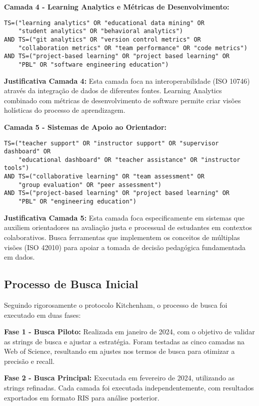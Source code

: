 \documentclass[english, spanish, brazilian]{RBIEarticle} %
\begin{document}
\textbf{Camada 4 - Learning Analytics e Métricas de Desenvolvimento:}
\begin{verbatim}
TS=("learning analytics" OR "educational data mining" OR
    "student analytics" OR "behavioral analytics")
AND TS=("git analytics" OR "version control metrics" OR
    "collaboration metrics" OR "team performance" OR "code metrics")
AND TS=("project-based learning" OR "project based learning" OR
    "PBL" OR "software engineering education")
\end{verbatim}

\textbf{Justificativa Camada 4:} Esta camada foca na interoperabilidade (ISO 10746) através da integração de dados de diferentes fontes. Learning Analytics combinado com métricas de desenvolvimento de software permite criar visões holísticas do processo de aprendizagem.

\textbf{Camada 5 - Sistemas de Apoio ao Orientador:}
\begin{verbatim}
TS=("teacher support" OR "instructor support" OR "supervisor dashboard" OR
    "educational dashboard" OR "teacher assistance" OR "instructor tools")
AND TS=("collaborative learning" OR "team assessment" OR
    "group evaluation" OR "peer assessment")
AND TS=("project-based learning" OR "project based learning" OR
    "PBL" OR "engineering education")
\end{verbatim}

\textbf{Justificativa Camada 5:} Esta camada foca especificamente em sistemas que auxiliem orientadores na avaliação justa e processual de estudantes em contextos colaborativos. Busca ferramentas que implementem os conceitos de múltiplas visões (ISO 42010) para apoiar a tomada de decisão pedagógica fundamentada em dados.

\subsection{Processo de Busca Inicial}

Seguindo rigorosamente o protocolo Kitchenham, o processo de busca foi executado em duas fases:

\textbf{Fase 1 - Busca Piloto:} Realizada em janeiro de 2024, com o objetivo de validar as strings de busca e ajustar a estratégia. Foram testadas as cinco camadas na Web of Science, resultando em ajustes nos termos de busca para otimizar a precisão e recall.

\textbf{Fase 2 - Busca Principal:} Executada em fevereiro de 2024, utilizando as strings refinadas. Cada camada foi executada independentemente, com resultados exportados em formato RIS para análise posterior.
\end{document}
